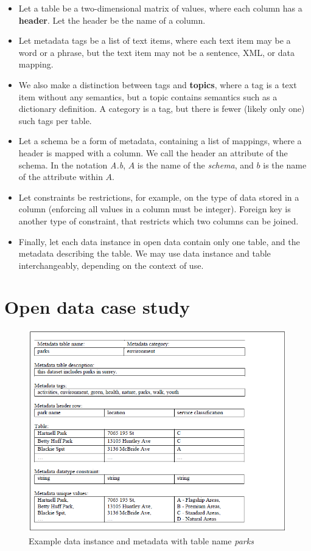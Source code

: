 \begin{itemize}
\item Let a table be a two-dimensional matrix of values, where each column has a \textbf{\gls{header}}. Let the header be the name of a column.
\item Let metadata tags be a list of text items, where each text item may be a word or a phrase, but the text item may not be a sentence, XML, or data mapping.
\item We also make a distinction between tags and \textbf{\glspl{topic}}, where a tag is a text item without any semantics, but a topic contains semantics such as a dictionary definition. A category is a tag, but there is fewer (likely only one) such tags per table.
\item Let a schema be a form of metadata, containing a list of mappings, where a header is mapped with a column. We call the header an attribute of the schema. In the notation \textit{A.b}, $A$ is the name of the \textit{schema}, and $b$ is the name of the attribute within $A$.
\item Let constraints be restrictions, for example, on the type of data stored in a column (enforcing all values in a column must be integer). Foreign key is another type of constraint, that restricts which two columns can be joined.
\item Finally, let each data instance in open data contain only one table, and the metadata describing the table. We may use data instance and table interchangeably, depending on the context of use.
\end{itemize}

\section{Open data case study}
\label{sec:OpenDataCaseStudy}

\begin{figure}
    \centering
    \includegraphics[width=5in]{figures/example-parks.png}
    \caption{Example data instance and metadata with table name \textit{parks}}
    \label{fig:example-parks}
\end{figure}

